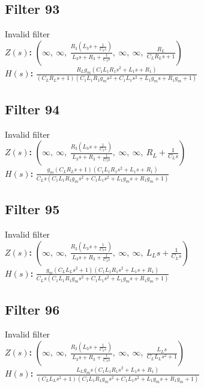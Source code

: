 \documentclass{article}
\begin{document}
\subsection*{Filter 93}
Invalid filter \\ 
\textbf{$Z(s)$:} $\left( \infty, \  \infty, \  \frac{R_{3} \left(L_{3} s + \frac{1}{C_{3} s}\right)}{L_{3} s + R_{3} + \frac{1}{C_{3} s}}, \  \infty, \  \infty, \  \frac{R_{L}}{C_{L} R_{L} s + 1}\right)$ \\ 
\textbf{$H(s)$:} $\frac{R_{L} g_{m} \left(C_{1} L_{1} R_{1} s^{2} + L_{1} s + R_{1}\right)}{\left(C_{L} R_{L} s + 1\right) \left(C_{1} L_{1} R_{1} g_{m} s^{2} + C_{1} L_{1} s^{2} + L_{1} g_{m} s + R_{1} g_{m} + 1\right)}$ \\ 
\subsection*{Filter 94}
Invalid filter \\ 
\textbf{$Z(s)$:} $\left( \infty, \  \infty, \  \frac{R_{3} \left(L_{3} s + \frac{1}{C_{3} s}\right)}{L_{3} s + R_{3} + \frac{1}{C_{3} s}}, \  \infty, \  \infty, \  R_{L} + \frac{1}{C_{L} s}\right)$ \\ 
\textbf{$H(s)$:} $\frac{g_{m} \left(C_{L} R_{L} s + 1\right) \left(C_{1} L_{1} R_{1} s^{2} + L_{1} s + R_{1}\right)}{C_{L} s \left(C_{1} L_{1} R_{1} g_{m} s^{2} + C_{1} L_{1} s^{2} + L_{1} g_{m} s + R_{1} g_{m} + 1\right)}$ \\ 
\subsection*{Filter 95}
Invalid filter \\ 
\textbf{$Z(s)$:} $\left( \infty, \  \infty, \  \frac{R_{3} \left(L_{3} s + \frac{1}{C_{3} s}\right)}{L_{3} s + R_{3} + \frac{1}{C_{3} s}}, \  \infty, \  \infty, \  L_{L} s + \frac{1}{C_{L} s}\right)$ \\ 
\textbf{$H(s)$:} $\frac{g_{m} \left(C_{L} L_{L} s^{2} + 1\right) \left(C_{1} L_{1} R_{1} s^{2} + L_{1} s + R_{1}\right)}{C_{L} s \left(C_{1} L_{1} R_{1} g_{m} s^{2} + C_{1} L_{1} s^{2} + L_{1} g_{m} s + R_{1} g_{m} + 1\right)}$ \\ 
\subsection*{Filter 96}
Invalid filter \\ 
\textbf{$Z(s)$:} $\left( \infty, \  \infty, \  \frac{R_{3} \left(L_{3} s + \frac{1}{C_{3} s}\right)}{L_{3} s + R_{3} + \frac{1}{C_{3} s}}, \  \infty, \  \infty, \  \frac{L_{L} s}{C_{L} L_{L} s^{2} + 1}\right)$ \\ 
\textbf{$H(s)$:} $\frac{L_{L} g_{m} s \left(C_{1} L_{1} R_{1} s^{2} + L_{1} s + R_{1}\right)}{\left(C_{L} L_{L} s^{2} + 1\right) \left(C_{1} L_{1} R_{1} g_{m} s^{2} + C_{1} L_{1} s^{2} + L_{1} g_{m} s + R_{1} g_{m} + 1\right)}$ \\ 
\end{document}

